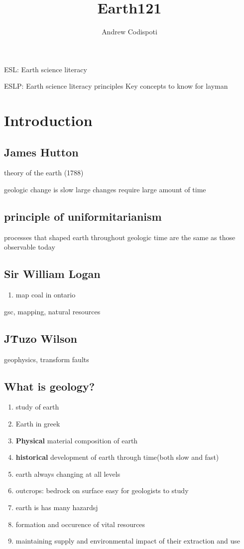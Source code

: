 \documentclass[11pt]{amsart}
\title{Earth121}
\author{Andrew Codispoti}
\begin{document}
\maketitle
\par ESL: Earth science literacy
\par ESLP: Earth science literacy principles Key concepts to know for layman


\section{Introduction}
\subsection{James Hutton}
\par theory of the earth (1788)
\par geologic change is slow large changes require large amount of time
\subsection{principle of uniformitarianism}
\par processes that shaped earth throughout geologic time are the same as those observable today
\subsection{Sir William Logan}
\begin{enumerate}
  \item map coal in ontario
\end{enumerate}
\par gsc, mapping, natural resources
\subsection{J\. Tuzo Wilson}
\par geophysics, transform faults
\subsection{What is geology?}
\begin{enumerate}
  \item study of earth
  \item Earth in greek
  \item \textbf{Physical} material composition of earth
  \item \textbf{historical} development of earth through time(both slow and
    fast)
  \item earth always changing at all levels
  \item outcrops: bedrock on surface {easy for geologists to study}
  \item earth is has many hazardsj
  \item formation and occurence of vital resources
  \item maintaining supply and environmental impact of their extraction and use
\end{enumerate}
\end{document}
